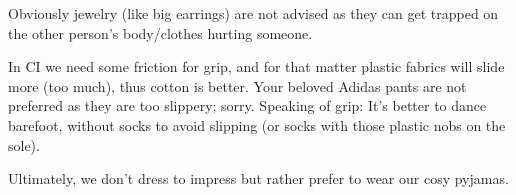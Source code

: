 Obviously jewelry (like big earrings) are not advised as they can get trapped on the other person's body/clothes hurting someone.

In CI we need some friction for grip, and for that matter plastic fabrics will slide more (too much), thus cotton is better.
Your beloved Adidas pants are not preferred as they are too slippery;
sorry.
Speaking of grip: It's better to dance barefoot, without socks to avoid slipping (or socks with those plastic nobs on the sole).


Ultimately, we don't dress to impress but rather prefer to wear our cosy pyjamas.
